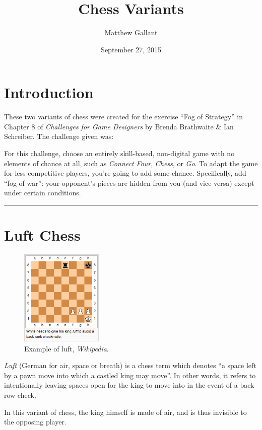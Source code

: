 \documentclass{article}
\title{Chess Variants}
\author{Matthew Gallant}
\date{September 27, 2015}
\begin{document}
\maketitle

\section{Introduction}
These two variants of chess were created for the exercise ``Fog of Strategy'' in Chapter 8 of \textit{Challenges for Game Designers} by Brenda Brathwaite \& Ian Schreiber. The challenge given was:

\begin{displayquote}
For this challenge, choose an entirely skill-based, non-digital game with no elements of chance at all, such as \textit{Connect Four}, \textit{Chess}, or \textit{Go}. To adapt the game for less competitive players, you're going to add some chance. Specifically, add ``fog of war'': your opponent's pieces are hidden from you (and vice versa) except under certain conditions.
\end{displayquote}

\noindent\hfil\rule{0.5\textwidth}{.4pt}\hfil

\section{Luft Chess}

\begin{figure}
\caption{Example of luft, \textit{Wikipedia}.}
\includegraphics[width=0.35\textwidth]{luft}
\end{figure}

\textit{Luft} (German for air, space or breath) is a chess term which denotes ``a space left by a pawn move into which a castled king may move''. In other words, it refers to intentionally leaving spaces open for the king to move into in the event of a back row check.

In this variant of chess, the king himself is made of air, and is thus invisible to the opposing player.
\end{document}
